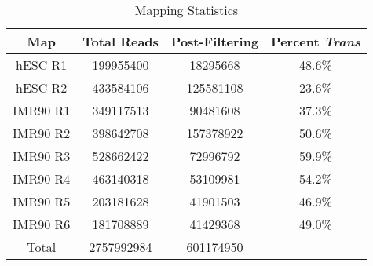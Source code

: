 \begin{table}[H]
  \centering
  \caption{Mapping Statistics}\label{tab:hmstats}
  \begin{tabular}{cccc}
    \toprule
    Map & Total Reads & Post-Filtering & Percent \textit{Trans} \\
    \midrule
    hESC R1  & 199955400 & 18295668  & 48.6\% \\
    hESC R2  & 433584106 & 125581108 & 23.6\% \\
    IMR90 R1 & 349117513 & 90481608  & 37.3\% \\
    IMR90 R2 & 398642708 & 157378922 & 50.6\% \\
    IMR90 R3 & 528662422 & 72996792  & 59.9\% \\
    IMR90 R4 & 463140318 & 53109981  & 54.2\% \\
    IMR90 R5 & 203181628 & 41901503  & 46.9\% \\
    IMR90 R6 & 181708889 & 41429368  & 49.0\% \\
    \midrule
    Total & 2757992984 & 601174950 & {} \\
    \bottomrule
  \end{tabular}
\end{table}
